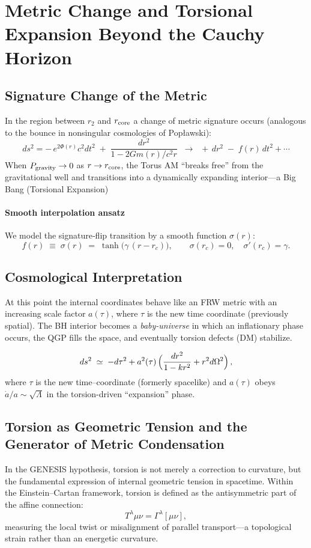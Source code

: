 \documentclass{article}
\begin{document}
\section{Metric Change and Torsional Expansion Beyond the Cauchy Horizon}
\label{sec:metric_switch}

\subsection{Signature Change of the Metric}
In the region between $r_2$ and $r_{\rm core}$ a change of metric signature occurs (analogous to the bounce in nonsingular cosmologies of Popławski):
\[
  ds^2 = -\,e^{2\Phi(r)}c^2dt^2 \;+\; \frac{dr^2}{1-2Gm(r)/c^2r}
  \;\;\longrightarrow\;\;
  +\,dr^2 \;-\; f(r)\,dt^2 + \cdots
\]
When $P_{\rm gravity}\to 0$ as $r\to r_{\rm core}$, the Torus AM “breaks free” from the gravitational well and transitions into a dynamically expanding interior—a Big Bang (Torsional Expansion)

\paragraph{Smooth interpolation ansatz}
We model the signature‐flip transition by a smooth function $\sigma(r)$:
\[
  f(r)\;\equiv\;\sigma(r)
  \;=\;\tanh\!\bigl(\gamma\,(r - r_c)\bigr),
  \qquad
  \sigma(r_c)=0,\quad\sigma'(r_c)=\gamma.
\]


\subsection{Cosmological Interpretation}
At this point the internal coordinates behave like an FRW metric with an increasing scale factor $a(\tau)$, where $\tau$ is the new time coordinate (previously spatial). The BH interior becomes a \emph{baby-universe} in which an inflationary phase occurs, the QGP fills the space, and eventually torsion defects (DM) stabilize.

\[
ds^2 \;\simeq\; -d\tau^2 + a^2(\tau)\,\Bigl(\frac{dr^2}{1-k r^2} + r^2 d\Omega^2\Bigr)\,,
\]
where \(\tau\) is the new time–coordinate (formerly spacelike) and \(a(\tau)\) obeys
\(\dot a/a\sim\sqrt{\Lambda}\) in the torsion-driven “expansion” phase.


\subsection{Torsion as Geometric Tension and the Generator of Metric Condensation} In the GENESIS hypothesis, torsion is not merely a correction to curvature, but the fundamental expression of internal geometric tension in spacetime. Within the Einstein--Cartan framework, torsion is defined as the antisymmetric part of the affine connection: \begin{equation} T^{\lambda}{}{\mu\nu} = \Gamma^{\lambda}{}{[\mu\nu]}, \end{equation} measuring the local twist or misalignment of parallel transport---a topological strain rather than an energetic curvature.
\end{document}
